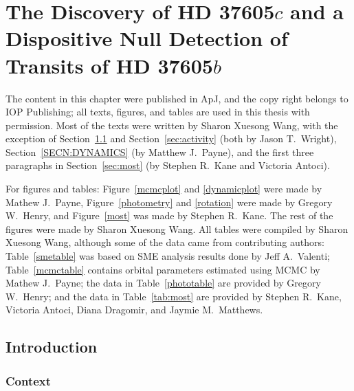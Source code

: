 \chapter{The Discovery of HD 37605\lowercase{$c$} and a Dispositive
  Null Detection of Transits of HD 37605\lowercase{$b$}}

{%
  The content in this chapter were published in ApJ, and the copy
  right belongs to IOP Publishing; all texts, figures, and tables are
  used in this thesis with permission. Most of the texts were written
  by Sharon Xuesong Wang, with the exception of
  Section~\ref{sec:intro} and Section~\ref{sec:activity} (both by
  Jason T.\ Wright), Section~\ref{SECN:DYNAMICS} (by Matthew
  J.\ Payne), and the first three paragraphs in Section~\ref{sec:most}
  (by Stephen R.\ Kane and Victoria Antoci).

  For figures and tables: Figure~\ref{mcmcplot} and \ref{dynamicplot}
  were made by Mathew J.\ Payne, Figure~\ref{photometry} and
  \ref{rotation} were made by Gregory W.\ Henry, and Figure~\ref{most}
  was made by Stephen R.\ Kane. The rest of the figures were made by
  Sharon Xuesong Wang. All tables were compiled by Sharon Xuesong
  Wang, although some of the data came from contributing authors:
  Table~\ref{smetable} was based on SME analysis results done by Jeff
  A.\ Valenti; Table~\ref{mcmctable} contains orbital parameters
  estimated using MCMC by Mathew J.\ Payne; the data in
  Table~\ref{phototable} are provided by Gregory W.\ Henry; and the
  data in Table~\ref{tab:most} are provided by Stephen R.\ Kane,
  Victoria Antoci, Diana Dragomir, and Jaymie M.\ Matthews.

  
}

\section{Introduction}\label{sec:intro}

\subsection{Context}

